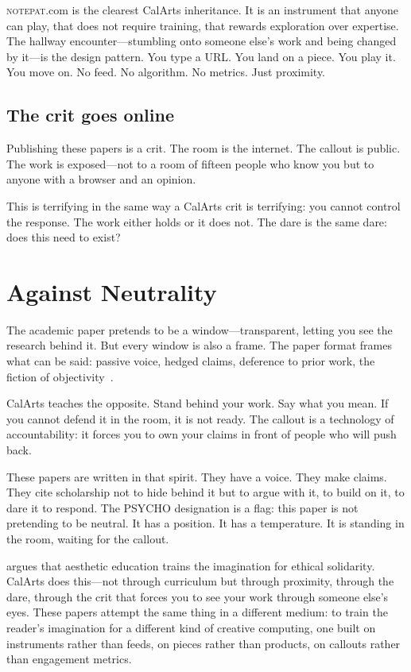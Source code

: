 \documentclass[10pt,letterpaper,twocolumn]{article}
\newcommand{\np}{\textsc{notepat}}
\begin{document}
\np{}.com is the clearest CalArts inheritance. It is an instrument that anyone can play, that does not require training, that rewards exploration over expertise. The hallway encounter---stumbling onto someone else's work and being changed by it---is the design pattern. You type a URL. You land on a piece. You play it. You move on. No feed. No algorithm. No metrics. Just proximity.

\subsection{The crit goes online}

Publishing these papers is a crit. The room is the internet. The callout is public. The work is exposed---not to a room of fifteen people who know you but to anyone with a browser and an opinion.

This is terrifying in the same way a CalArts crit is terrifying: you cannot control the response. The work either holds or it does not. The dare is the same dare: does this need to exist?

\section{Against Neutrality}

The academic paper pretends to be a window---transparent, letting you see the research behind it. But every window is also a frame. The paper format frames what can be said: passive voice, hedged claims, deference to prior work, the fiction of objectivity~\citep{freire1970pedagogy}.

CalArts teaches the opposite. Stand behind your work. Say what you mean. If you cannot defend it in the room, it is not ready. The callout is a technology of accountability: it forces you to own your claims in front of people who will push back.

These papers are written in that spirit. They have a voice. They make claims. They cite scholarship not to hide behind it but to argue with it, to build on it, to dare it to respond. The PSYCHO designation is a flag: this paper is not pretending to be neutral. It has a position. It has a temperature. It is standing in the room, waiting for the callout.

\citet{spivak2012aesthetic} argues that aesthetic education trains the imagination for ethical solidarity. CalArts does this---not through curriculum but through proximity, through the dare, through the crit that forces you to see your work through someone else's eyes. These papers attempt the same thing in a different medium: to train the reader's imagination for a different kind of creative computing, one built on instruments rather than feeds, on pieces rather than products, on callouts rather than engagement metrics.
\end{document}
